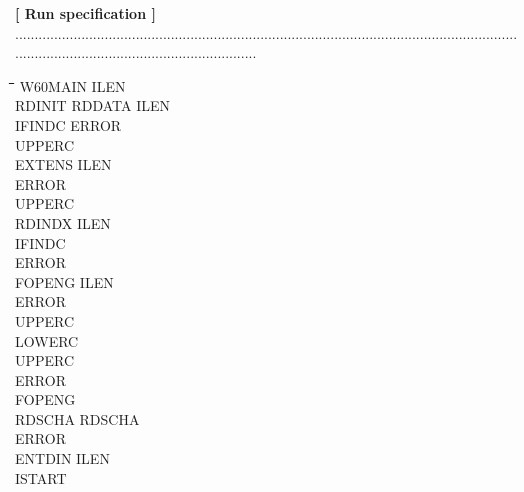 \documentclass[11pt]{article}
\begin{document}
\strut\hfill {\bf [ Run specification ]}\\
...............................................................................................................................................................................................\-\nwln
\begin{tabbing}
\hspace{1.27cm}\=\hspace{1.27cm}\=\hspace{1.27cm}\=\hspace{1.27cm}\=%
\hspace{1.27cm}\=\hspace{1.27cm}\=\hspace{1.27cm}\=\hspace{1.27cm}\=%
\hspace{1.27cm}\=\hspace{1.27cm}\=\kill
W60MAIN\> ILEN\\
\>\> RDINIT\> \> RDDATA\> \> ILEN\\
\>\> \> \> IFINDC\> \> ERROR\\
\>\> \> \> UPPERC\\
\>\> \> \> EXTENS\> \> ILEN\\
\>\> \> \> \> \> ERROR\\
\>\> \> \> \> \> UPPERC\\
\>\> \> \> RDINDX\> \> ILEN\\
\>\> \> \> \> \> IFINDC\\
\>\> \> \> \> \> ERROR\\
\>\> \> \> \> \> FOPENG\> \> ILEN\\
\>\> \> \> \> \> \> \> ERROR\\
\>\> \> \> \> \> \> \> UPPERC\\
\>\> \> \> \> \> \> \> LOWERC\\
\>\> \> \> \> \> UPPERC\\
\>\> \> \> ERROR\\
\>\> \> \> FOPENG\\
\>\> RDSCHA\> \> RDSCHA\\
\>\> ERROR\\
\>\> ENTDIN\> \> ILEN\\
\>\> \> \> ISTART
\end{tabbing}
\end{document}
